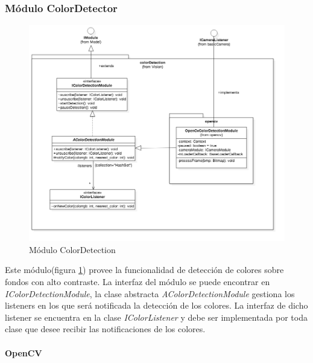 \subsubsection{Módulo ColorDetector}
\begin{figure}
	\centering
	\includegraphics[width=1\linewidth]{imagenes/diagramas/ColorDetectionModule.png}
	\caption{Módulo ColorDetection}
	\label{fig:color-detection-module}
\end{figure}
Este módulo(figura \ref{fig:color-detection-module}) provee la funcionalidad de detección de colores sobre fondos con alto contraste. La interfaz del módulo se puede encontrar en \textit{IColorDetectionModule}, la clase abstracta \textit{AColorDetectionModule} gestiona los listeners en los que será notificada la detección de los colores. La interfaz de dicho listener se encuentra en la clase \textit{IColorListener} y debe ser implementada por toda clase que desee recibir las notificaciones de los colores.

\paragraph*{OpenCV\\}

